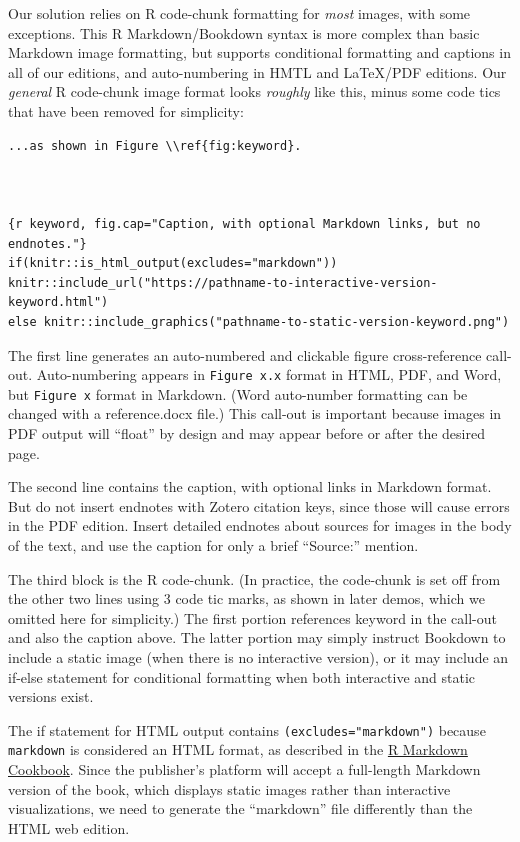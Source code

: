 \documentclass[
  english,
]{book}
\begin{document}
Our solution relies on R code-chunk formatting for \emph{most} images, with some exceptions. This R Markdown/Bookdown syntax is more complex than basic Markdown image formatting, but supports conditional formatting and captions in all of our editions, and auto-numbering in HMTL and LaTeX/PDF editions. Our \emph{general} R code-chunk image format looks \emph{roughly} like this, minus some code tics that have been removed for simplicity:

\begin{verbatim}
...as shown in Figure \\ref{fig:keyword}.



{r keyword, fig.cap="Caption, with optional Markdown links, but no endnotes."}
if(knitr::is_html_output(excludes="markdown")) knitr::include_url("https://pathname-to-interactive-version-keyword.html")
else knitr::include_graphics("pathname-to-static-version-keyword.png")
\end{verbatim}

The first line generates an auto-numbered and clickable figure cross-reference call-out. Auto-numbering appears in \texttt{Figure\ x.x} format in HTML, PDF, and Word, but \texttt{Figure\ x} format in Markdown. (Word auto-number formatting can be changed with a reference.docx file.) This call-out is important because images in PDF output will ``float'' by design and may appear before or after the desired page.

The second line contains the caption, with optional links in Markdown format. But do not insert endnotes with Zotero citation keys, since those will cause errors in the PDF edition. Insert detailed endnotes about sources for images in the body of the text, and use the caption for only a brief ``Source:'' mention.

The third block is the R code-chunk. (In practice, the code-chunk is set off from the other two lines using 3 code tic marks, as shown in later demos, which we omitted here for simplicity.) The first portion references keyword in the call-out and also the caption above. The latter portion may simply instruct Bookdown to include a static image (when there is no interactive version), or it may include an if-else statement for conditional formatting when both interactive and static versions exist.

The if statement for HTML output contains \texttt{(excludes="markdown")} because \texttt{markdown} is considered an HTML format, as described in the \href{https://bookdown.org/yihui/rmarkdown-cookbook/latex-html.html}{R Markdown Cookbook}. Since the publisher's platform will accept a full-length Markdown version of the book, which displays static images rather than interactive visualizations, we need to generate the ``markdown'' file differently than the HTML web edition.
\end{document}

